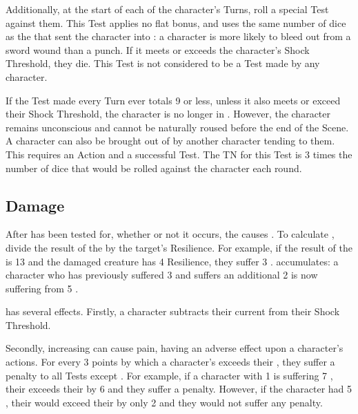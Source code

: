 Additionally, at the start of each of the  character's Turns, roll a special Test against them.
This Test applies no flat bonus, and uses the same number of dice as the  that sent the character into : a character is more likely to bleed out from a sword wound than a punch.
If it meets or exceeds the  character's Shock Threshold, they die.
This Test is not considered to be a Test made by any character.

If the Test made every Turn ever totals 9 or less, unless it also meets or exceed their Shock Threshold, the character is no longer in .
However, the character remains unconscious and cannot be naturally roused before the end of the Scene.
A character can also be brought out of  by another character tending to them.
This requires an Action and a successful  Test.
The TN for this Test is 3 times the number of dice that would be rolled against the  character each round.

\subsection{Damage}

After  has been tested for, whether or not it occurs, the  causes .
To calculate , divide the result of the  by the target's Resilience.
For example, if the result of the  is 13 and the damaged creature has 4 Resilience, they suffer 3 .
 accumulates: a character who has previously suffered 3  and suffers an additional 2 is now suffering from 5 .

 has several effects.
Firstly, a character subtracts their current  from their Shock Threshold.

Secondly, increasing  can cause pain, having an adverse effect upon a character's actions.
For every 3 points by which a character's  exceeds their , they suffer a  penalty to all Tests except .
For example, if a character with 1  is suffering 7 , their  exceeds their  by 6 and they suffer a  penalty.
However, if the character had 5 , their  would exceed their  by only 2 and they would not suffer any penalty.

